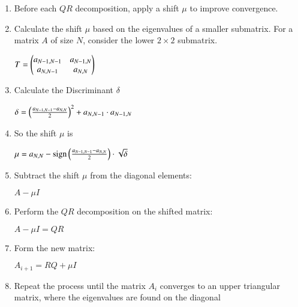 \documentclass[journal]{IEEEtran}
\begin{document}
\begin{enumerate}[label=\textbullet]
    \item Before each $QR$ decomposition, apply a shift $\mu$ to improve convergence.
    \item Calculate the shift $\mu$ based on the eigenvalues of a smaller submatrix. For a matrix $A$ of size $N$, consider the lower $2 \times 2$ submatrix.
    \begin{center}
        $T = \begin{pmatrix}a_{N-1,N-1} & a_{N-1,N} \\ a_{N,N-1} & a_{N,N}\end{pmatrix}$
    \end{center}
    \item Calculate the Discriminant $\delta$
    \begin{center}
        $\delta = \left(\frac{a_{N-1,N-1} - a_{N,N}}{2}\right)^2 + a_{N,N-1}\cdot a_{N-1,N}$
    \end{center}
    \item So the shift $\mu$ is
    \begin{center}
        $\mu = a_{N,N} - \text{sign}\left(\frac{a_{N-1,N-1} - a_{N,N}}{2}\right)\cdot \sqrt{\delta} $
    \end{center}
    \item Subtract the shift $\mu$ from the diagonal elements:
    \begin{center}
        $A-\mu I$
    \end{center}
    \item Perform the $QR$ decomposition on the shifted matrix:
    \begin{center}
        $A - \mu I = QR$
    \end{center}
    \item Form the new matrix:
    \begin{center}
        $A_{i+1} = RQ + \mu I$
    \end{center}
    \item Repeat the process until the matrix $A_i$ converges to an upper triangular matrix, where the eigenvalues are found on the diagonal
\end{enumerate}
\end{document}
